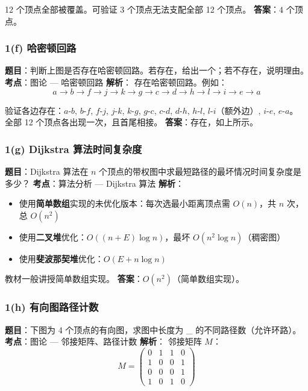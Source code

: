 \documentclass[10pt,a4paper,openany]{ctexbook}
\theoremstyle{definition}
\theoremstyle{remark}
\begin{document}
12 个顶点全部被覆盖。可验证 3 个顶点无法支配全部 12 个顶点。
\textbf{答案}：$\boxed{4}$ 个顶点。
\vspace{-2pt}

\subsubsection{1(f) 哈密顿回路}

\textbf{题目}：判断上图是否存在哈密顿回路。若存在，给出一个；若不存在，说明理由。
\textbf{考点}：图论 — 哈密顿回路
\textbf{解析}：
存在哈密顿回路。例如：
\[
 a \to b \to f \to j \to k \to g \to c \to d \to h \to l \to i \to e \to a 
\]

验证各边存在：$a$-$b$, $b$-$f$, $f$-$j$, $j$-$k$, $k$-$g$, $g$-$c$, $c$-$d$, $d$-$h$, $h$-$l$, $l$-$i$（额外边）, $i$-$e$, $e$-$a$。
全部 12 个顶点各出现一次，且首尾相接。
\textbf{答案}：存在，如上所示。
\vspace{-2pt}

\subsubsection{1(g) Dijkstra 算法时间复杂度}

\textbf{题目}：Dijkstra 算法在 $n$ 个顶点的带权图中求最短路径的最坏情况时间复杂度是多少？
\textbf{考点}：算法分析 — Dijkstra 算法
\textbf{解析}：
\begin{itemize}
\item 使用\textbf{简单数组}实现的未优化版本：每次选最小距离顶点需 $O(n)$，共 $n$ 次，总 $O(n^2)$
\item 使用\textbf{二叉堆}优化：$O((n + E)\log n)$，最坏 $O(n^2 \log n)$（稠密图）
\item 使用\textbf{斐波那契堆}优化：$O(E + n\log n)$

\end{itemize}

教材一般讲授简单数组实现。
\textbf{答案}：$\boxed{O(n^2)}$（简单数组实现）。
\vspace{-2pt}

\subsubsection{1(h) 有向图路径计数}

\textbf{题目}：下图为 4 个顶点的有向图，求图中长度为 \_ 的不同路径数（允许环路）。
\textbf{考点}：图论 — 邻接矩阵、路径计数
\textbf{解析}：
邻接矩阵 $M$：
\[
M = \begin{pmatrix}
0 & 1 & 1 & 0 \\
1 & 0 & 0 & 1 \\
0 & 0 & 0 & 1 \\
1 & 0 & 1 & 0
\end{pmatrix}
\]
\end{document}
